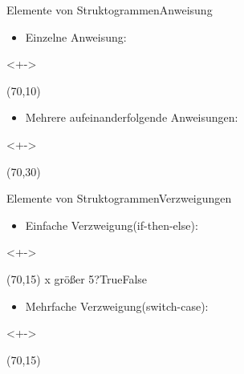 \begin{frame}{Elemente von Struktogrammen}{Anweisung}
\begin{itemize}
    \item <+->Einzelne Anweisung:
\end{itemize}
\begin{onlyenv}<+->
\begin{centernss}
    \begin{struktogramm}(70,10)
    \end{struktogramm}
\end{centernss}
\end{onlyenv}

\begin{itemize}
    \item <+-> Mehrere aufeinanderfolgende Anweisungen:
\end{itemize}
\begin{onlyenv}<+->
\begin{centernss}
    \begin{struktogramm}(70,30)
    \end{struktogramm}
\end{centernss}
\end{onlyenv}
\end{frame}

\begin{frame}{Elemente von Struktogrammen}{Verzweigungen}
\begin{itemize}
    \item <+->Einfache Verzweigung(if-then-else):
\end{itemize}
\begin{onlyenv}<+->
\begin{centernss}
\begin{struktogramm}(70,15)
            {x größer 5?}{True}{False}
        \change
        \ifend
    \end{struktogramm}
\end{centernss}
\end{onlyenv}
\begin{itemize}
    \item <+-> Mehrfache Verzweigung(switch-case):
\end{itemize}
\begin{onlyenv}<+->
\begin{centernss}
    \begin{struktogramm}(70,15)
        \caseend
    \end{struktogramm}
\end{centernss}
\end{onlyenv}
\end{frame}

